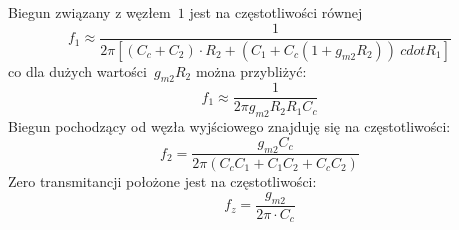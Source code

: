 \documentclass[twoside,pl,final]{labman}
\begin{document}
Biegun związany z węzłem~$1$ jest na częstotliwości równej
\begin{equation}
  f_1 \approx \frac{1}{2 \pi [(C_c + C_2) \cdot R_2 + (C_1 + C_c(1 + g_{m2}R_2)) \ cdot R_1]}
\end{equation}
co dla dużych wartości~$g_{m2}R_2$ można przybliżyć:
\begin{equation}
  f_1 \approx \frac{1}{2 \pi g_{m2}R_2R_1C_c}
\end{equation}
Biegun pochodzący od węzła wyjściowego znajduję się na częstotliwości:
\begin{equation}
  f_2 = \frac{g_{m2}C_c}{2 \pi (C_cC_1 + C_1C_2 + C_cC_2)}
\end{equation}
Zero transmitancji położone jest na częstotliwości:
\begin{equation}
  f_z = \frac{g_{m2}}{2 \pi \cdot C_c}
\end{equation}




\end{document}
